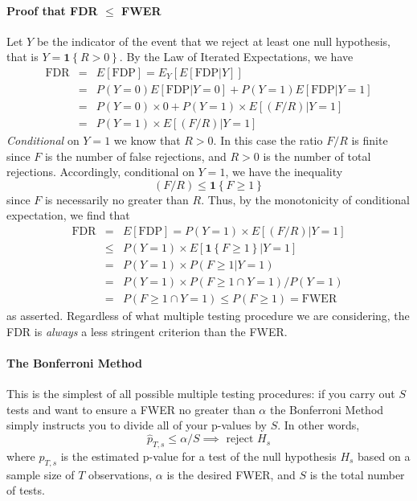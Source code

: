 \paragraph{Proof that FDR $\leq$ FWER}
Let $Y$ be the indicator of the event that we reject at least one null hypothesis, that is $Y = \mathbf{1}\left\{R > 0 \right\}$.
By the Law of Iterated Expectations, we have
\begin{eqnarray*}
  \mbox{FDR} &=& E\left[ \mbox{FDP} \right] = E_Y\left[ E\left[ \mbox{FDP}|Y \right] \right]\\
  &=& P\left( Y=0 \right) E\left[ \mbox{FDP}|Y=0 \right] + P\left( Y=1 \right) E\left[ \mbox{FDP}|Y=1 \right]\\
  &=& P(Y=0) \times 0 + P(Y=1) \times E\left[\left( F/R \right) \left| Y=1 \right. \right]\\
  &=&  P(Y=1)\times E\left[\left( F/R \right) \left| Y=1 \right. \right]
\end{eqnarray*}
\emph{Conditional} on $Y=1$ we know that $R>0$.
In this case the ratio $F/R$ is finite since $F$ is the number of false rejections, and $R>0$ is the number of total rejections.
Accordingly, conditional on $Y=1$, we have the inequality
\begin{equation*}
  \left( F/R \right) \leq \mathbf{1}\left\{ F \geq 1 \right\}
\end{equation*}
since $F$ is necessarily no greater than $R$.
Thus, by the monotonicity of conditional expectation, we find that
\begin{eqnarray*}
  \mbox{FDR} &=& E\left[ \mbox{FDP} \right] = P(Y=1)\times E\left[\left( F/R \right) \left| Y=1 \right. \right]\\
  &\leq& P(Y=1) \times E\left[ \mathbf{1}\left\{ F \geq 1 \right\}| Y=1 \right] \\
  &=& P(Y=1) \times P\left( F\geq 1 | Y=1 \right)\\
  &=& P(Y=1) \times P\left( F\geq 1 \cap Y =1 \right) / P(Y=1)\\
  &=& P(F\geq 1 \cap Y=1) \leq P(F \geq 1) = \mbox{FWER}
\end{eqnarray*}
as asserted. 
Regardless of what multiple testing procedure we are considering, the FDR is \emph{always} a less stringent criterion than the FWER.


\paragraph{The Bonferroni Method}
This is the simplest of all possible multiple testing procedures: if you carry out $S$ tests and want to ensure a FWER no greater than $\alpha$ the Bonferroni Method simply instructs you to divide all of your p-values by $S$.
In other words, 
\begin{equation*}
  \widehat{p}_{T,s} \leq \alpha/S \implies \mbox{ reject } H_s
\end{equation*}
where $\widehat{p}_{T,s}$ is the estimated p-value for a test of the null hypothesis $H_s$ based on a sample size of $T$ observations, $\alpha$ is the desired FWER, and $S$ is the total number of tests.

